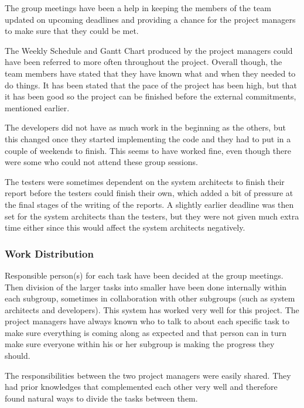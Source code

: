 \documentclass[a4paper]{article}
\begin{document}
The group meetings have been a help in keeping the members of the team updated on upcoming deadlines and providing a chance for the project managers to make sure that they could be met.

The Weekly Schedule and Gantt Chart produced by the project managers could have been referred to more often throughout the project. Overall though, the team members have stated that they have known what and when they needed to do things. It has been stated that the pace of the project has been high, but that it has been good so the project can be finished before the external commitments, mentioned earlier. 

The developers did not have as much work in the beginning as the others, but this changed once they started implementing the code and they had to put in a couple of weekends to finish. This seems to have worked fine, even though there were some who could not attend these group sessions.

The testers were sometimes dependent on the system architects to finish their report before the testers could finish their own, which added a bit of pressure at the final stages of the writing of the reports. A slightly earlier deadline was then set for the system architects than the testers, but they were not given much extra time either since this would affect the system architects negatively.



\subsubsection{Work Distribution}

Responsible person(s) for each task have been decided at the group meetings. Then division of the larger tasks into smaller have been done internally within each subgroup, sometimes in collaboration with other subgroups (such as system architects and developers). This system has worked very well for this project. The project managers have always known who to talk to about each specific task to make sure everything is coming along as expected and that person can in turn make sure everyone within his or her subgroup is making the progress they should.

The responsibilities between the two project managers were easily shared. They had prior knowledges that complemented each other very well and therefore found natural ways to divide the tasks between them.
\end{document}
